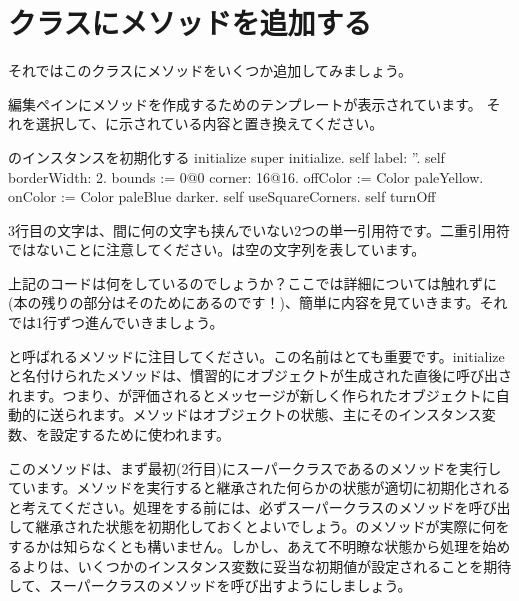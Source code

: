\documentclass[a4paper,10pt,twoside]{book}
\begin{document}
\section{クラスにメソッドを追加する}

それではこのクラスにメソッドをいくつか追加してみましょう。


編集ペインにメソッドを作成するためのテンプレートが表示されています。
それを選択して、に示されている内容と置き換えてください。


\begin{numMethod}[scbecellinitialize]{のインスタンスを初期化する}
initialize
   super initialize.
   self label: ''.
   self borderWidth: 2.
   bounds := 0@0 corner: 16@16.
   offColor := Color paleYellow.
   onColor := Color paleBlue darker.
   self useSquareCorners.
   self turnOff
\end{numMethod}

\noindent
3行目の文字は、間に何の文字も挟んでいない2つの単一引用符です。二重引用符ではないことに注意してください。は空の文字列を表しています。


上記のコードは何をしているのでしょうか？ここでは詳細については触れずに(本の残りの部分はそのためにあるのです！)、簡単に内容を見ていきます。それでは1行ずつ進んでいきましょう。

と呼ばれるメソッドに注目してください。この名前はとても重要です。initializeと名付けられたメソッドは、慣習的にオブジェクトが生成された直後に呼び出されます。つまり、が評価されるとメッセージが新しく作られたオブジェクトに自動的に送られます。メソッドはオブジェクトの状態、主にそのインスタンス変数、を設定するために使われます。

このメソッドは、まず最初(2行目)にスーパークラスであるのメソッドを実行しています。メソッドを実行すると継承された何らかの状態が適切に初期化されると考えてください。処理をする前には、必ずスーパークラスのメソッドを呼び出して継承された状態を初期化しておくとよいでしょう。のメソッドが実際に何をするかは知らなくとも構いません。しかし、あえて不明瞭な状態から処理を始めるよりは、いくつかのインスタンス変数に妥当な初期値が設定されることを期待して、スーパークラスのメソッドを呼び出すようにしましょう。
\end{document}
